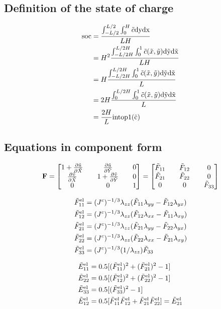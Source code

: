 \documentclass[../main.tex]{subfiles}
\begin{document}
\subsection{Definition of the state of charge}

\begin{align}
    \rm{soc} &= \frac{\int_{-L/2}^{L/2} \int_0^H \tilde{c} \rm{d}y \rm{d}x}{L H} \\
         &= H^2\frac{\int_{-L/2H}^{L/2H} \int_0^1 \tilde{c}(\tilde{x}, \tilde{y}) \rm{d}\tilde{y} \rm{d}\tilde{x}}{L H} \\
         &= H\frac{\int_{-L/2H}^{L/2H} \int_0^1 \tilde{c}(\tilde{x}, \tilde{y}) \rm{d}\tilde{y} \rm{d}\tilde{x}}{L} \\
         &= 2 H\frac{\int_0^{L/2H} \int_0^1 \tilde{c}(\tilde{x}, \tilde{y}) \rm{d}\tilde{y} \rm{d}\tilde{x}}{L} \\
         &= \frac{2 H }{L} \rm{intop1}(\tilde{c})
\end{align}

\subsection{Equations in component form}
\begin{align}
\mathbf{F} = 
\begin{bmatrix}
       1 + \frac{\partial \tilde{u}}{\partial \tilde{X}} && \frac{\partial \tilde{u}}{\partial \tilde{Y}} && 0 \\
       \frac{\partial \tilde{v}}{\partial \tilde{X}} && 1 + \frac{\partial \tilde{v}}{\partial \tilde{Y}} && 0 \\
       0 && 0 && 1
\end{bmatrix} = \begin{bmatrix}
    \tilde{F}_{11} && \tilde{F}_{12}  && 0 \\
    \tilde{F}_{21} && \tilde{F}_{22}  && 0 \\
    0 && 0 && \tilde{F}_{33}
\end{bmatrix}
\end{align}

\begin{align}
    \tilde{F}_{11}^{{\rm{el}}} &= ({J^c})^{-1/3} \lambda_{zz} (\tilde{F}_{11} \lambda_{yy} - \tilde{F}_{12} \lambda_{yx})\\
   \tilde{F}_{12}^{{\rm{el}}} &= ({J^c})^{-1/3} \lambda_{zz} (\tilde{F}_{12} \lambda_{xx} - \tilde{F}_{11} \lambda_{xy})\\
   \tilde{F}_{21}^{{\rm{el}}} &= ({J^c})^{-1/3} \lambda_{zz} (\tilde{F}_{21} \lambda_{yy} - \tilde{F}_{22} \lambda_{yx})\\
    \tilde{F}_{22}^{{\rm{el}}} &= ({J^c})^{-1/3} \lambda_{zz} (\tilde{F}_{22} \lambda_{xx} - \tilde{F}_{21} \lambda_{xy})\\
    \tilde{F}_{33}^{{\rm{el}}} &= ({J^c})^{-1/3} (1/\lambda_{zz}) \tilde{F}_{33}
\end{align}

\begin{align}
    \tilde{E}_{11}^{{\rm{el}}} &= 0.5[(\tilde{F}_{11}^{{\rm{el}}})^2 + (\tilde{F}_{21}^{{\rm{el}}})^2 - 1] \\
    \tilde{E}_{22}^{{\rm{el}}} &= 0.5[(\tilde{F}_{12}^{{\rm{el}}})^2 + (\tilde{F}_{22}^{{\rm{el}}})^2 - 1] \\
    \tilde{E}_{33}^{{\rm{el}}} &= 0.5[(\tilde{F}_{33}^{{\rm{el}}})^2 - 1] \\
    \tilde{E}_{12}^{{\rm{el}}} &= 0.5[\tilde{F}_{11}^{{\rm{el}}}\tilde{F}_{12}^{{\rm{el}}}  + \tilde{F}_{21}^{{\rm{el}}}\tilde{F}_{22}^{{\rm{el}}}] = \tilde{E}_{21}^{{\rm{el}}}
\end{align}
\end{document}
